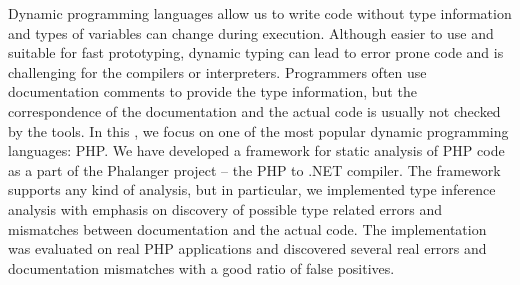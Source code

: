 Dynamic programming languages allow us to write code without type 
information and types of variables can change during execution. 
Although easier to use and suitable for fast prototyping, 
dynamic typing can lead to error prone code and is challenging 
for the compilers or interpreters.
Programmers often use documentation comments to provide 
the type information, but the \mbox{correspondence} of the 
documentation and the actual code is usually not checked 
by the tools. In this \wthesis, we focus on one of the most popular dynamic 
programming languages: PHP. We have developed a framework 
for static analysis of PHP code as a part of the Phalanger project -- 
the PHP to .NET compiler. The framework supports any kind of analysis, 
but in particular, we implemented type inference analysis with emphasis 
on discovery of possible type related errors and mismatches between 
documentation and the actual code. The implementation was evaluated 
on real PHP applications and discovered several real errors and 
documentation mismatches with a good ratio of false positives.